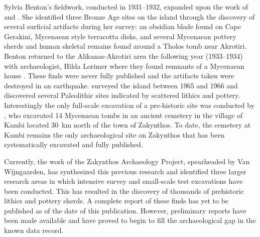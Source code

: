 Sylvia Benton’s fieldwork, conducted in 1931--1932, expanded upon the work of \textcite{Riemann_1879} and \textcite{Schmidt_1899}. She identified three Bronze Age sites on the island through the discovery of several surficial artifacts during her survey: an obsidian blade found on Cape Gerakini, Mycenaean style terracotta disks, and several Mycenaean pottery sherds and human skeletal remains found around a Tholos tomb near Akrotiri. Benton returned to the Alikanas-Akrotiri area the following year (1933--1934) with archaeologist, Hilda Lorimer where they found remnants of a Mycenaean house \parencite{Benton_1933}. These finds were never fully published and the artifacts taken were destroyed in an earthquake. \textcite{Sordinas_1970} surveyed the island between 1965 and 1966 and discovered several Paleolithic sites indicated by scattered lithics and pottery. Interestingly the only full-scale excavation of a pre-historic site was conducted by \textcite{Agallopoulou_1973}, who excavated 14 Mycenaean tombs in an ancient cemetery in the village of Kambi located \SI{30}{\kilo\metre} north of the town of Zakynthos. To date, the cemetery at Kambi remains the only archaeological site on Zakynthos that has been systematically excavated and fully published.
	
Currently, the work of the Zakynthos Archaeology Project, spearheaded by Van Wijngaarden, has synthesized this previous research and identified three larger research areas in which intensive survey and small-scale test excavations have been conducted. This has resulted in the discovery of thousands of prehistoric lithics and pottery sherds. A complete report of these finds has yet to be published as of the date of this publication. However, preliminary reports have been made available and have proved to begin to fill the archaeological gap in the known data record.
	
	
